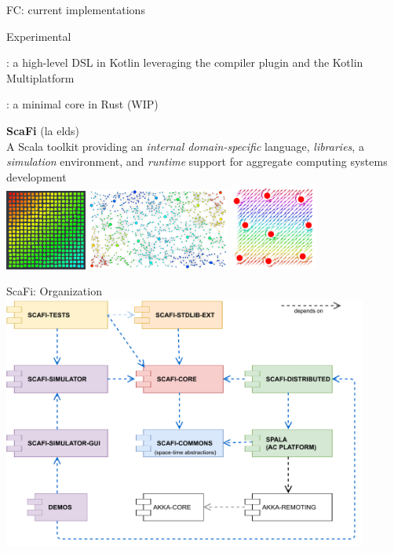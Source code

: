 \documentclass[presentation, 9pt]{beamer}\mode<presentation>{\usetheme{AMSBolognaFC}}
\begin{document}
\begin{frame}[allowframebreaks]{FC: current implementations}
    \begin{exampleblock}{Experimental}
        \item {}: a high-level DSL in Kotlin leveraging the compiler plugin and the Kotlin Multiplatform
        \item {}: a minimal core in Rust (WIP)
    \end{exampleblock}
\end{frame}
\begin{frame}[c, plain]
\begin{center}
	{\Huge \textbf{ScaFi} (la elds)}\\
	{\large A Scala toolkit providing an \emph{internal domain-specific} language, \emph{libraries}, a \emph{simulation} environment, and \emph{runtime} support for  aggregate computing systems development} \\[0.3cm]
	\includegraphics[width=0.2\textwidth]{img/gradient-scafi.png}
	\includegraphics[width=0.35\textwidth]{img/scr-result.png}
	\includegraphics[width=0.215\textwidth]{img/obstacle-avoidance.png}
\end{center}
\end{frame}
\begin{frame}{ScaFi: Organization}
\centering
\includegraphics[width=0.9\textwidth]{img/scafi-project-org.pdf}
\end{frame}
\end{document}
